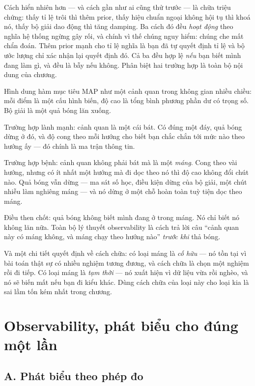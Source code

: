 \documentclass[../../vslam.tex]{subfiles}
\begin{document}
Cách hiển nhiên hơn --- và cách gần như ai cũng thử trước --- là chữa triệu chứng: thấy tỉ lệ trôi thì thêm prior, thấy hiệu chuẩn ngoại không hội tụ thì khoá nó, thấy bộ giải dao động thì tăng damping. Ba cách đó đều \emph{hoạt động} theo nghĩa hệ thống ngừng gây rối, và chính vì thế chúng nguy hiểm: chúng che mất chẩn đoán. Thêm prior mạnh cho tỉ lệ nghĩa là bạn đã tự quyết định tỉ lệ và bộ ước lượng chỉ xác nhận lại quyết định đó. Cả ba đều hợp lệ \emph{nếu} bạn biết mình đang làm gì, và đều là bẫy nếu không. Phân biệt hai trường hợp là toàn bộ nội dung của chương.

\begin{trucgiac}
Hình dung hàm mục tiêu MAP như một cảnh quan trong không gian nhiều chiều: mỗi điểm là một cấu hình biến, độ cao là tổng bình phương phần dư có trọng số. Bộ giải là một quả bóng lăn xuống.

Trường hợp lành mạnh: cảnh quan là một cái bát. Có đúng một đáy, quả bóng dừng ở đó, và độ cong theo mỗi hướng cho biết bạn chắc chắn tới mức nào theo hướng ấy --- đó chính là ma trận thông tin.

Trường hợp bệnh: cảnh quan không phải bát mà là một \emph{máng}. Cong theo vài hướng, nhưng có ít nhất một hướng mà đi dọc theo nó thì độ cao không đổi chút nào. Quả bóng vẫn dừng --- ma sát số học, điều kiện dừng của bộ giải, một chút nhiễu làm nghiêng máng --- và nó dừng ở một chỗ hoàn toàn tuỳ tiện dọc theo máng.

Điều then chốt: quả bóng không biết mình đang ở trong máng. Nó chỉ biết nó không lăn nữa. Toàn bộ lý thuyết observability là cách trả lời câu ``cảnh quan này có máng không, và máng chạy theo hướng nào'' \emph{trước khi} thả bóng.

Và một chi tiết quyết định về cách chữa: có loại máng là \emph{cố hữu} --- nó tồn tại vì bài toán thật sự có nhiều nghiệm tương đương, và cách chữa là chọn một nghiệm rồi đi tiếp. Có loại máng là \emph{tạm thời} --- nó xuất hiện vì dữ liệu vừa rồi nghèo, và nó sẽ biến mất nếu bạn đi kiểu khác. Dùng cách chữa của loại này cho loại kia là sai lầm tốn kém nhất trong chương.
\end{trucgiac}

\section{Observability, phát biểu cho đúng một lần}

\subsection{A. Phát biểu theo phép đo}
\end{document}
